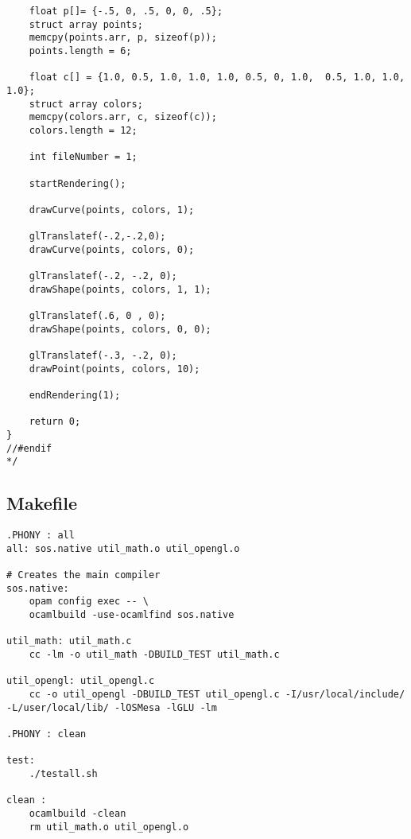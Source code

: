 \documentclass[main.tex]{subfiles}
\begin{document}
\begin{lstlisting}
    float p[]= {-.5, 0, .5, 0, 0, .5};
    struct array points;
    memcpy(points.arr, p, sizeof(p));
    points.length = 6;

    float c[] = {1.0, 0.5, 1.0, 1.0, 1.0, 0.5, 0, 1.0,  0.5, 1.0, 1.0, 1.0};
    struct array colors;
    memcpy(colors.arr, c, sizeof(c));
    colors.length = 12;

    int fileNumber = 1;

    startRendering();

    drawCurve(points, colors, 1);
    
    glTranslatef(-.2,-.2,0);
    drawCurve(points, colors, 0);

    glTranslatef(-.2, -.2, 0);
    drawShape(points, colors, 1, 1);

    glTranslatef(.6, 0 , 0);
    drawShape(points, colors, 0, 0);

    glTranslatef(-.3, -.2, 0);
    drawPoint(points, colors, 10);

    endRendering(1);

    return 0;
}
//#endif
*/
\end{lstlisting}

\subsection{Makefile}
\begin{lstlisting}
.PHONY : all
all: sos.native util_math.o util_opengl.o

# Creates the main compiler
sos.native:
	opam config exec -- \
	ocamlbuild -use-ocamlfind sos.native

util_math: util_math.c
	cc -lm -o util_math -DBUILD_TEST util_math.c

util_opengl: util_opengl.c
	cc -o util_opengl -DBUILD_TEST util_opengl.c -I/usr/local/include/ -L/user/local/lib/ -lOSMesa -lGLU -lm

.PHONY : clean

test: 
	./testall.sh

clean : 
	ocamlbuild -clean
	rm util_math.o util_opengl.o

\end{lstlisting}
\end{document}
